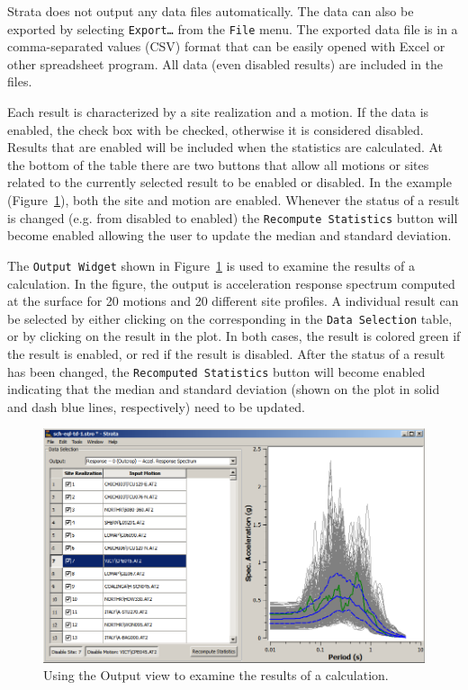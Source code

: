 \documentclass[12pt,oneside]{book}
\begin{document}
Strata does not output any data files automatically.   The data can also be exported by selecting
\texttt{Export\dots} from the \texttt{File} menu.  The exported data file is in a comma-separated
values (CSV) format that can be easily opened with Excel or other spreadsheet program.  All data
(even disabled results) are included in the files.

Each result is characterized by a site realization and a motion.  If the data is enabled, the check
box with be checked, otherwise it is considered disabled.  Results that are enabled will be included
when the statistics are calculated. At the bottom of the table there are two buttons that allow all
motions or sites related to the currently selected result to be enabled or disabled.  In the example
(Figure~\ref{fig:strata:outputWidget}), both the site and motion are enabled.  Whenever the status
of a result is changed (e.g. from disabled to enabled) the \texttt{Recompute Statistics} button will
become enabled allowing the user to update the median and standard deviation.

The \texttt{Output Widget} shown in Figure~\ref{fig:strata:outputWidget} is used to
examine the results of a calculation.  In the figure, the output is acceleration response spectrum
computed at the surface for 20 motions and 20 different site profiles.  A individual result can be
selected by either clicking on the corresponding in the \texttt{Data Selection} table, or by
clicking on the result in the plot.  In both cases, the result is colored green if the result is
enabled, or red if the result is disabled.  After the status of a result has been changed, the
\texttt{Recomputed Statistics} button will become enabled indicating that the median and standard
deviation (shown on the plot in solid and dash blue lines, respectively) need to be updated.  

\begin{figure}
    \begin{center}
        \includegraphics[scale=0.65]{figures/strata/outputWidget.png}
    \end{center}
    \caption{Using the Output view to examine the results of a calculation.}
    \label{fig:strata:outputWidget}
\end{figure}
\end{document}
